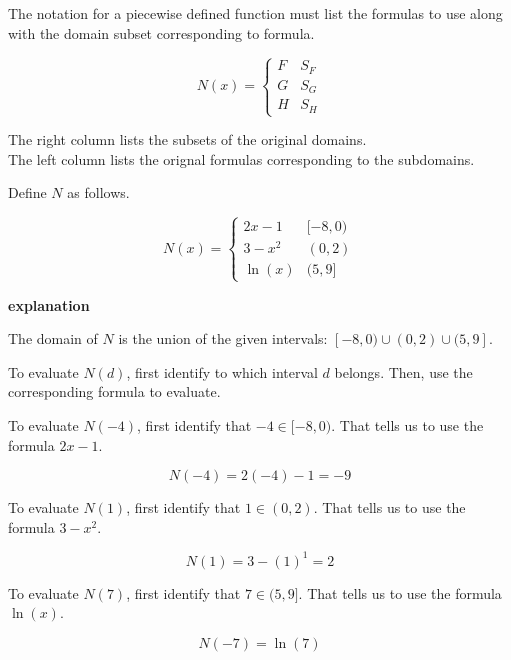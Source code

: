 \documentclass{ximera}
\begin{document}
\begin{notation}


The notation for a piecewise defined function must list the formulas to use along with the domain subset corresponding to formula.



\[
N(x) = 
\begin{cases}
  F & S_F     \\
  G & S_G \\
  H & S_H
\end{cases}
\]



The right column lists the subsets of the original domains.  \\
The left column lists the orignal formulas corresponding to the subdomains.

\end{notation}






\begin{example}

Define $N$ as follows.


\[
N(x) = 
\begin{cases}
  2x - 1   &    [-8, 0)     \\
  3 - x^2  &    (0, 2) \\
  \ln(x)    &    (5, 9]
\end{cases}
\]


\textbf{\textcolor{red!75!green}{explanation}} 

The domain of $N$ is the union of the given intervals: $[-8, 0) \cup (0,2) \cup (5, 9]$.


To evaluate $N(d)$, first identify to which interval $d$ belongs.  Then, use the corresponding formula to evaluate.








To evaluate $N(-4)$, first identify that $-4 \in [-8, 0)$.  That tells us to use the formula $2x - 1$. 

\[  N(-4) = 2(-4) - 1 = -9  \]





To evaluate $N(1)$, first identify that $1 \in (0, 2)$.  That tells us to use the formula $3 - x^2$. 

\[  N(1) = 3 - (1)^1 = 2  \]





To evaluate $N(7)$, first identify that $7 \in (5, 9]$.  That tells us to use the formula $\ln(x)$. 

\[  N(-7) = \ln(7)  \]



\end{example}
\end{document}
